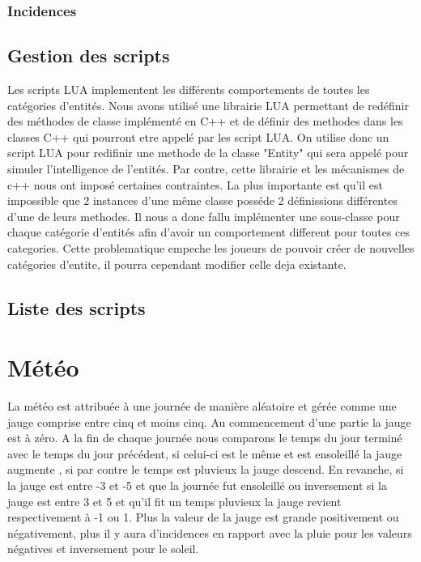 \documentclass[a4paper]{article}
\begin{document}
			\subsubsection{Incidences}
			
		\subsection{Gestion des scripts}
			Les scripts LUA implementent les différents comportements de toutes les catégories d'entités. Nous avons utilisé une librairie LUA permettant de redéfinir des méthodes de classe implémenté en C++ et de définir des methodes dans les classes C++ qui pourront etre appelé par les script LUA.
			On utilise donc un script LUA pour redifinir une methode de la classe "Entity" qui sera appelé pour simuler l'intelligence de l'entités.
			Par contre, cette librairie et les mécanismes de c++ nous ont imposé certaines contraintes. La plus importante est qu'il est impossible que 2 instances d'une même classe posséde 2 définissions différentes d'une de leurs methodes. Il nous a donc fallu implémenter une sous-classe pour chaque catégorie d'entités afin d'avoir un comportement different pour toutes ces categories. Cette problematique empeche les joueurs de pouvoir créer de nouvelles catégories d'entite, il pourra cependant modifier celle deja existante.
			
			
		\subsection{Liste des scripts}
		
	
	\section{Météo}
	La météo est attribuée à une journée de manière aléatoire et gérée comme une jauge comprise entre cinq et moins cinq. Au commencement d'une partie la jauge est à zéro.
	A la fin de chaque journée nous comparons le temps du jour terminé avec le temps du jour précédent, si celui-ci est le même  et est  ensoleillé la jauge augmente , si par contre le temps est pluvieux la jauge descend.
	En revanche, si la jauge est  entre -3 et -5 et que la journée fut ensoleillé ou inversement si la jauge est entre 3 et 5 et qu'il fit un temps pluvieux la jauge revient respectivement à -1 ou 1.
	Plus la valeur de la jauge est grande positivement ou négativement, plus il y aura d'incidences en rapport avec la pluie pour les valeurs négatives et inversement pour le soleil.
	
\end{document}
